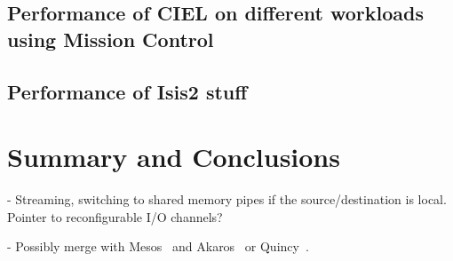 \documentclass[a4paper,12pt,twoside,openright]{report}
\begin{document}
\section{Performance of CIEL on different workloads using Mission Control}
\section{Performance of Isis2 stuff}

\chapter{Summary and Conclusions}\label{chapter:conclusion}

 
- Streaming, switching to shared memory pipes if the source/destination is
local. Pointer to reconfigurable I/O channels?

- Possibly merge with Mesos~\cite{Hindman:2011:MPF} and
Akaros~\cite{Rhoden:2011:IPE} or Quincy~\cite{Isard:2009:QFS}.


\appendix
\singlespacing

 
 
\end{document}
